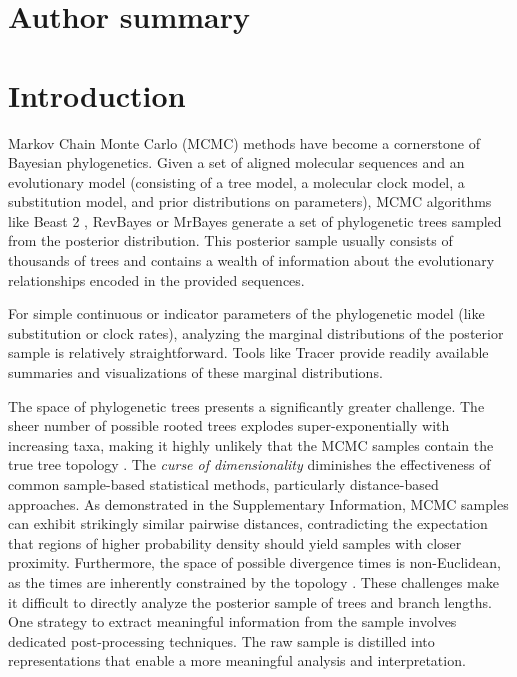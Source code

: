 \documentclass[10pt,letterpaper]{article}
\begin{document}
\section*{Author summary}


\linenumbers

\section*{Introduction}

Markov Chain Monte Carlo (MCMC) methods have become a cornerstone of Bayesian phylogenetics. Given a set of aligned molecular sequences and an evolutionary model (consisting of a tree model, a molecular clock model, a substitution model, and prior distributions on parameters), MCMC algorithms like Beast 2 \cite{beast2}, RevBayes \cite{revbayes} or MrBayes \cite{mrbayes} generate a set of phylogenetic trees sampled from the posterior distribution. This posterior sample usually consists of thousands of trees and contains a wealth of information about the evolutionary relationships encoded in the provided sequences.

For simple continuous or indicator parameters of the phylogenetic model (like substitution or clock rates), analyzing the marginal distributions of the posterior sample is relatively straightforward. Tools like Tracer \cite{tracer} provide readily available summaries and visualizations of these marginal distributions.

The space of phylogenetic trees presents a significantly greater challenge. The sheer number of possible rooted trees explodes super-exponentially with increasing taxa, making it highly unlikely that the MCMC samples contain the true tree topology \cite{ccd}. The \emph{curse of dimensionality} \cite{curse,curse2} diminishes the effectiveness of common sample-based statistical methods, particularly distance-based approaches. As demonstrated in the Supplementary Information, MCMC samples can exhibit strikingly similar pairwise distances, contradicting the expectation that regions of higher probability density should yield samples with closer proximity. Furthermore, the space of possible divergence times is non-Euclidean, as the times are inherently constrained by the topology \cite{steelsemple,wald,tauspace,tropical,bhv}. These challenges make it difficult to directly analyze the posterior sample of trees and branch lengths. One strategy to extract meaningful information from the sample involves dedicated post-processing techniques. The raw sample is distilled into representations that enable a more meaningful analysis and interpretation.
\end{document}
